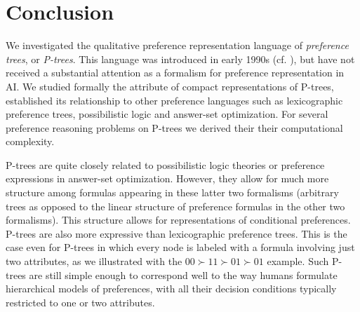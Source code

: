%
%


\section{Conclusion}

We investigated the qualitative preference representation language of 
\textit{preference trees}, or \textit{P-trees}. This language was 
introduced in early 1990s (cf. \cite{fraser1993,fraser1994}), but have 
not received a substantial attention as a formalism for preference 
representation in AI. We studied formally the attribute of compact 
representations of
P-trees, established its relationship to other preference languages
such as lexicographic preference trees, possibilistic logic and
answer-set optimization. For several preference reasoning problems 
on P-trees we derived their their computational complexity.

P-trees are quite closely related to possibilistic logic theories or
preference expressions in answer-set optimization. However, they allow
for much more structure among formulas appearing in these latter two
formalisms (arbitrary trees as opposed to the linear structure of 
preference formulas in the other two formalisms). This structure allows 
for representations of conditional preferences. P-trees are also more
expressive than lexicographic preference trees. This is the case even 
for P-trees in which every node is labeled with a formula involving just
two attributes, as we illustrated with the $00\succ 11\succ 01\succ 01$ 
example. Such P-trees are still simple enough to correspond well to
the way humans formulate hierarchical models of preferences, with all
their decision conditions typically restricted to one or two attributes. 

